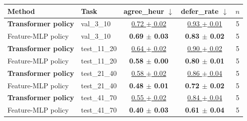 \begin{tabular}{llccc}
\toprule
Method & Task & agree\_heur $\downarrow$ & defer\_rate $\downarrow$ & $n$ \\
\midrule
\textbf{Transformer policy} & val\_3\_10 & \underline{0.72 $\pm$ 0.02} & \underline{0.93 $\pm$ 0.01} & 5 \\
Feature-MLP policy & val\_3\_10 & \textbf{0.69 $\pm$ 0.03} & \textbf{0.83 $\pm$ 0.02} & 5 \\
\midrule
\textbf{Transformer policy} & test\_11\_20 & \underline{0.64 $\pm$ 0.02} & \underline{0.90 $\pm$ 0.02} & 5 \\
Feature-MLP policy & test\_11\_20 & \textbf{0.58 $\pm$ 0.00} & \textbf{0.80 $\pm$ 0.01} & 5 \\
\midrule
\textbf{Transformer policy} & test\_21\_40 & \underline{0.58 $\pm$ 0.02} & \underline{0.86 $\pm$ 0.04} & 5 \\
Feature-MLP policy & test\_21\_40 & \textbf{0.48 $\pm$ 0.01} & \textbf{0.72 $\pm$ 0.02} & 5 \\
\midrule
\textbf{Transformer policy} & test\_41\_70 & \underline{0.55 $\pm$ 0.02} & \underline{0.84 $\pm$ 0.04} & 5 \\
Feature-MLP policy & test\_41\_70 & \textbf{0.40 $\pm$ 0.03} & \textbf{0.61 $\pm$ 0.04} & 5 \\
\bottomrule
\end{tabular}
